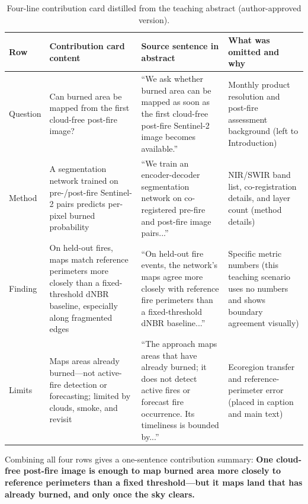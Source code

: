 \begin{table}[htbp]\centering\footnotesize
\setlength{\tabcolsep}{3pt}
\renewcommand{\arraystretch}{1.15}
\caption{Four-line contribution card distilled from the teaching abstract (author-approved version).}\label{tab:ch10-02-card}
\begin{tabularx}{\linewidth}{@{}>{\raggedright\arraybackslash}p{15mm}Y>{\raggedright\arraybackslash}p{34mm}>{\raggedright\arraybackslash}p{34mm}@{}}
\toprule
\textbf{Row} & \textbf{Contribution card content} & \textbf{Source sentence in abstract} & \textbf{What was omitted and why} \\
\midrule
Question & Can burned area be mapped from the first cloud-free post-fire image? & ``We ask whether burned area can be mapped as soon as the first cloud-free post-fire Sentinel-2 image becomes available.'' & Monthly product resolution and post-fire assessment background (left to Introduction) \\
Method & A segmentation network trained on pre-/post-fire Sentinel-2 pairs predicts per-pixel burned probability & ``We train an encoder-decoder segmentation network on co-registered pre-fire and post-fire image pairs...'' & NIR/SWIR band list, co-registration details, and layer count (method details) \\
Finding & On held-out fires, maps match reference perimeters more closely than a fixed-threshold dNBR baseline, especially along fragmented edges & ``On held-out fire events, the network's maps agree more closely with reference fire perimeters than a fixed-threshold dNBR baseline...'' & Specific metric numbers (this teaching scenario uses no numbers and shows boundary agreement visually) \\
Limits & Maps areas already burned---not active-fire detection or forecasting; limited by clouds, smoke, and revisit & ``The approach maps areas that have already burned; it does not detect active fires or forecast fire occurrence. Its timeliness is bounded by...'' & Ecoregion transfer and reference-perimeter error (placed in caption and main text) \\
\bottomrule
\end{tabularx}
\end{table}

Combining all four rows gives a one-sentence contribution summary: \textbf{One cloud-free post-fire image is enough to map burned area more closely to reference perimeters than a fixed threshold---but it maps land that has already burned, and only once the sky clears.}

